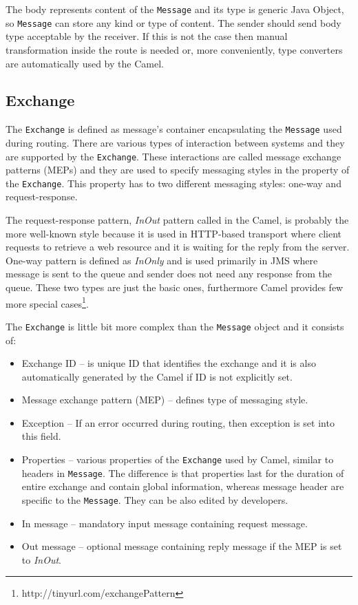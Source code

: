 \documentclass[12pt,final,oneside]{fithesis2}
\begin{document}
The body represents content of the \texttt{Message} and its type is generic Java Object, so \texttt{Message} can store any kind or type of content. The sender should send body type acceptable by the receiver. If this is not the case then manual transformation inside the route is needed or, more conveniently, type converters are automatically used by the Camel.


\subsection*{Exchange}
The \texttt{Exchange} is defined as message's container encapsulating the \texttt{Message} used during routing. There are various types of interaction between systems and they are supported by the \texttt{Exchange}. These interactions are called message exchange patterns (MEPs) and they are used to specify messaging styles in the property of the  \texttt{Exchange}. This property has to two different messaging styles: one-way and request-response. 

The request-response pattern, \textit{InOut} pattern called in the Camel, is probably the more well-known style because it is used in HTTP-based transport where client requests to retrieve a web resource and it is waiting for the reply from the server. One-way pattern is defined as \textit{InOnly} and is used primarily in JMS where message is sent to the queue and sender does not need any response from the queue. These two types are just the basic ones, furthermore Camel provides few more special cases\footnote{http://tinyurl.com/exchangePattern}.\cite{camel-exchange}

The \texttt{Exchange} is little bit more complex than the \texttt{Message} object and it consists of\cite{camel-in-action}:
\begin{itemize}
\item
Exchange ID -- is unique ID that identifies the exchange and it is also automatically generated by the Camel if ID is not explicitly set.

\item
Message exchange pattern (MEP) -- defines type of messaging style.

\item
Exception -- If an error occurred during routing, then exception is set into this field.

\item
Properties -- various properties of the \texttt{Exchange} used by Camel, similar to headers in \texttt{Message}. The difference is that properties last for the duration of entire exchange and contain global information, whereas message header are specific to the \texttt{Message}. They can be also edited by developers.

\item
In message -- mandatory input message containing request message.

\item
Out message -- optional message containing reply message if the MEP is set to \textit{InOut}.
\end{itemize}
\end{document}
